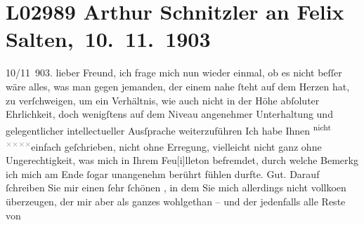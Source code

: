 

\section[ Arthur Schnitzler an Felix Salten, 10. 11. 1903]{L02989 Arthur Schnitzler an Felix Salten, 10. 11. 1903}
\nopagebreak{}
\rehead{ }\normalsize\beginnumbering{}
\toendnotes[C]{\smallbreak\pagebreak[2]}
\toendnotes[C]{\smallbreak}
\pstart
           \raggedleft{}{\pb}10/11 903.\pend
           \vspace{0.5em}
\pstart
           lieber Freund, ich frage mich nun wieder einmal, ob es nicht beſſer
               wäre alles, was man gegen jemanden, der einem nahe ſteht auf dem Herzen hat, zu
               verſchweigen, um ein Verhältnis, wie auch nicht in der Höhe abſoluter Ehrlichkeit,
               doch wenigſtens auf dem Niveau angenehmer Unterhaltung {\pb}und gelegentlicher intellectueller Ausſprache
                  weiterzuführen{\dotstwo} Ich habe Ihnen \substVorne{}\textsuperscript{nicht \textcolor{gray}{×}\-\textcolor{gray}{×}\-\textcolor{gray}{×}\-\textcolor{gray}{×}}\substDazwischen{}einfach geſchrie\substHinten{}ben, nicht ohne Erregung, vielleicht nicht ganz ohne Ungerechtigkeit, was
               mich in Ihrem Feu{[}i{]}lleton befremdet, durch welche Bemerkg ich mich
               am Ende ſogar unangenehm berührt fühlen durfte. Gut. Darauf ſchreiben Sie mir einen
               ſehr {\pb}ſchönen \label{K_L02989-1v}\label{K_L02989-1}, in dem Sie mich allerdings nicht vollko{\geminationm}en
               überzeugen, der mir aber als ganzes wohlgethan – und der jedenfalls alle Reste von
